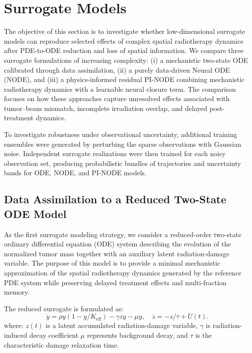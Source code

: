 
\section{Surrogate Models}
\label{sec:surrogates}

The objective of this section is to investigate whether low-dimensional
surrogate models can reproduce selected effects of complex spatial
radiotherapy dynamics after PDE-to-ODE reduction and loss of spatial
information.
We compare three surrogate formulations of increasing complexity:
(i) a mechanistic two-state ODE calibrated through data assimilation,
(ii) a purely data-driven Neural ODE (NODE), and
(iii) a physics-informed residual PI-NODE combining mechanistic
radiotherapy dynamics with a learnable neural closure term.
The comparison focuses on how these approaches capture unresolved
effects associated with tumor--beam mismatch, incomplete irradiation
overlap, and delayed post-treatment dynamics.

To investigate robustness under observational uncertainty, additional
training ensembles were generated by perturbing the sparse observations
with Gaussian noise. Independent surrogate realizations were then
trained for each noisy observation set, producing probabilistic bundles
of trajectories and uncertainty bands for ODE, NODE, and PI-NODE models.

\subsection{Data Assimilation to a Reduced Two-State ODE Model}

As the first surrogate modeling strategy, we consider a reduced-order
two-state ordinary differential equation (ODE) system describing the
evolution of the normalized tumor mass together with an auxiliary latent
radiation-damage variable. The purpose of this model is to provide a
minimal mechanistic approximation of the spatial radiotherapy dynamics
generated by the reference PDE system while preserving delayed treatment
effects and multi-fraction memory.

The reduced surrogate is formulated as:
\begin{equation}
\label{eq:ode_rt_2state}
\dot y=\rho y(1-y/K_{\mathrm{eff}})-\gamma zy-\mu y,
\quad
\dot z=-z/\tau+U(t).
\end{equation}
where: \(z(t)\) is a latent accumulated radiation-damage variable, $\gamma$ is radiation-induced decay coefficient
\(\mu\) represents background decay,
and \(\tau\) is the characteristic damage relaxation time.

